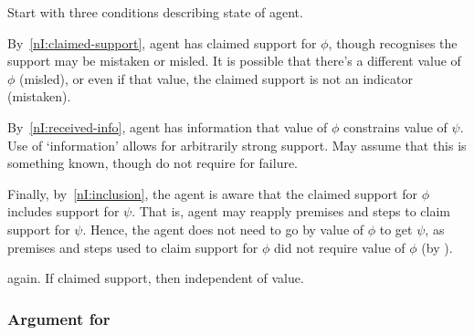\begin{note}
  Start with three conditions describing state of agent.

  By~\ref{nI:claimed-support}, agent has claimed support for \(\phi\), though recognises the support may be mistaken or misled.
  It is possible that there's a different value of \(\phi\) (misled), or even if that value, the claimed support is not an indicator (mistaken).

  By~\ref{nI:received-info}, agent has information that value of \(\phi\) constrains value of \(\psi\).
  Use of `information' allows for arbitrarily strong support.
  May assume that this is something known, though do not require for failure.

  Finally, by~\ref{nI:inclusion}, the agent is aware that the claimed support for \(\phi\) includes support for \(\psi\).
  That is, agent may reapply premises and steps to claim support for \(\psi\).
  Hence, the agent does not need to go by value of \(\phi\) to get \(\psi\), as premises and steps used to claim support for \(\phi\) did not require value of \(\phi\) (by \eiS{}).
\end{note}


\begin{note}[\eiS{}]
  \eiS{} again.
  If claimed support, then independent of value.
\end{note}

\subsubsection{Argument for \nI{}}
\label{sec:argument-ni}



